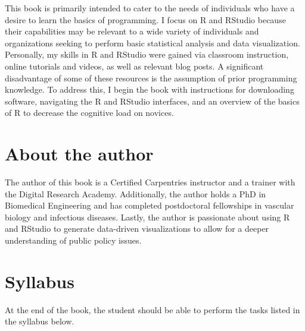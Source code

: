 \documentclass[
  letterpaper,
  DIV=11,
  numbers=noendperiod]{scrreprt}
\begin{document}

This book is primarily intended to cater to the needs of individuals who
have a desire to learn the basics of programming. I focus on R and
RStudio because their capabilities may be relevant to a wide variety of
individuals and organizations seeking to perform basic statistical
analysis and data visualization. Personally, my skills in R and RStudio
were gained via classroom instruction, online tutorials and videos, as
well as relevant blog posts. A significant disadvantage of some of these
resources is the assumption of prior programming knowledge. To address
this, I begin the book with instructions for downloading software,
navigating the R and RStudio interfaces, and an overview of the basics
of R to decrease the cognitive load on novices.

\hypertarget{about-the-author}{%
\section*{About the author}\label{about-the-author}}


The author of this book is a Certified Carpentries instructor and a
trainer with the Digital Research Academy. Additionally, the author
holds a PhD in Biomedical Engineering and has completed postdoctoral
fellowships in vascular biology and infectious diseases. Lastly, the
author is passionate about using R and RStudio to generate data-driven
visualizations to allow for a deeper understanding of public policy
issues.

\hypertarget{syllabus}{%
\section*{Syllabus}\label{syllabus}}


At the end of the book, the student should be able to perform the tasks
listed in the syllabus below.
\end{document}
